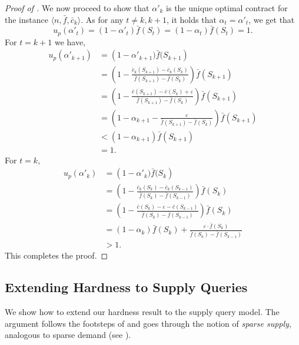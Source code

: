 \documentclass[11pt]{article}
\newcommand{\eps}{\varepsilon}
\newcommand{\feq}{\bar{f}}
\newcommand{\ceq}{\bar{c}}
\begin{document}
\begin{proof}[Proof of ]
    We now proceed to show that $\alpha'_k$ is the unique optimal contract for the instance $\langle n, \feq, \ceq_k \rangle$.
    As for any $t \ne k, k+1$, it holds that $\alpha_t = \alpha'_{t}$, we get that 
    $$
    u_p(\alpha'_t) = (1-\alpha'_t)\feq(S_t) =(1-\alpha_t)\feq(S_t) = 1.
    $$
    For $t = k+1$ we have,
    \begin{align*}
    u_p(\alpha'_{k+1})
    &=
    \left(1-\alpha'_{k+1})\feq(S_{k+1}\right) \\
    &=
    \left(1-\frac{\ceq_k(S_{k+1}) - \ceq_k(S_{k})}{\feq(S_{k+1}) - \feq(S_{k})}\right)\feq(S_{k+1}) \\
    &=
    \left(1-\frac{\ceq(S_{k+1}) - \ceq(S_{k}) + \eps}{\feq(S_{k+1}) - \feq(S_{k})}\right)\feq(S_{k+1}) \\
    &=
    \left(1-\alpha_{k+1} - \frac{\eps}{\feq(S_{k+1}) - \feq(S_{k})}\right)\feq(S_{k+1}) \\
    &<
    (1-\alpha_{k+1})\feq(S_{k+1}) \\
    &=
    1.
    \end{align*}
    For $t = k$,
    \begin{align*}
    u_p(\alpha'_{k})
    &=
    \left(1-\alpha'_{k})\feq(S_{k}\right) \\
    &=
    \left(1-\frac{\ceq_k(S_{k}) - \ceq_k(S_{k-1})}{\feq(S_{k}) - \feq(S_{k-1})}\right)\feq(S_{k}) \\
    &=
    \left(1-\frac{\ceq(S_{k}) - \eps - \ceq(S_{k-1})}{\feq(S_{k}) - \feq(S_{k-1})}\right)\feq(S_{k}) \\
    &=
    (1-\alpha_k)\feq(S_k) + \frac{\eps \cdot \feq(S_{k})}{\feq(S_{k}) - \feq(S_{k-1})} \\
    &>
    1.
    \end{align*}   
    This completes the proof.
\end{proof}

\subsection{Extending Hardness to Supply Queries}\label{sec:SparsetoDemand_SupMod_c}

We show how to extend our hardness result to the supply query model. The argument follows the footsteps of  and goes through the notion of \textit{sparse supply}, analogous to sparse demand (see ).
\end{document}
